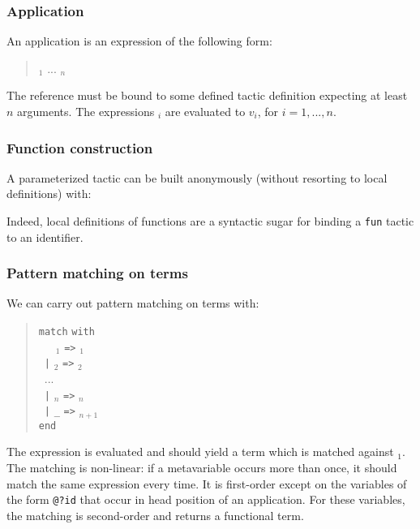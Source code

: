 \subsubsection{Application}

An application is an expression of the following form:
\begin{quote}
{\qualid} {\tacarg}$_1$ ... {\tacarg}$_n$
\end{quote}
The reference {\qualid} must be bound to some defined tactic
definition expecting at least $n$ arguments.  The expressions
{\tacexpr}$_i$ are evaluated to $v_i$, for $i=1,...,n$.


\subsubsection[Function construction]{Function construction
}

A parameterized tactic can be built anonymously (without resorting to
local definitions) with:
\begin{quote}
{}
\end{quote}
Indeed, local definitions of functions are a syntactic sugar for
binding a {\tt fun} tactic to an identifier.

\subsubsection[Pattern matching on terms]{Pattern matching on terms
}

We can carry out pattern matching on terms with:
\begin{quote}
{\tt match} {\tacexpr} {\tt with}\\
~~~{\cpattern}$_1$ {\tt =>} {\tacexpr}$_1$\\
~{\tt |} {\cpattern}$_2$ {\tt =>} {\tacexpr}$_2$\\
~...\\
~{\tt |} {\cpattern}$_n$ {\tt =>} {\tacexpr}$_n$\\
~{\tt |} {\tt \_} {\tt =>} {\tacexpr}$_{n+1}$\\
{\tt end}
\end{quote}
The expression {\tacexpr} is evaluated and should yield a term which
is matched against {\cpattern}$_1$. The matching is non-linear: if a
metavariable occurs more than once, it should match the same
expression every time. It is first-order except on the
variables of the form {\tt @?id} that occur in head position of an
application. For these variables, the matching is second-order and
returns a functional term.

